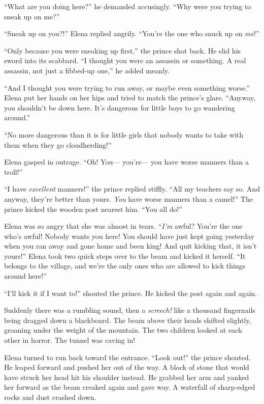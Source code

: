 \documentclass[10pt]{book}
\begin{document}
``What are you doing here?'' he demanded accusingly. ``Why were you trying to sneak up on me?''

``Sneak up on you?!'' Elena replied angrily. ``You're the one who snuck up on \emph{me}!''

``Only because you were sneaking up first,'' the prince shot back. He slid his sword into its scabbard. ``I thought you were an assassin or something. A real assassin, not just a fibbed-up one,'' he added meanly.

``And I thought you were trying to run away, or maybe even something worse.'' Elena put her hands on her hips and tried to match the prince's glare. ``Anyway, you shouldn't be down here. It's dangerous for little boys to go wandering around.''

``No more dangerous than it is for little girls that nobody wants to take with them when they go cloudherding!''

Elena gasped in outrage. ``Oh! You--- you're--- you have worse manners than a troll!''

``I have \emph{excellent} manners!'' the prince replied stiffly. ``All my teachers say so. And anyway, they're better than yours. \emph{You} have worse manners than a camel!'' The prince kicked the wooden post nearest him. ``You all do!''

Elena was so angry that she was almost in tears. ``\emph{I'm} awful? You're the one who's awful! Nobody wants you here! You should have just kept going yesterday when you ran away and gone home and been king! And quit kicking that, it isn't yours!'' Elena took two quick steps over to the beam and kicked it herself. ``It belongs to the village, and we're the only ones who are allowed to kick things around here!''

``I'll kick it if I want to!'' shouted the prince. He kicked the post again and again.

Suddenly there was a rumbling sound, then a \emph{screech!} like a thousand fingernails being dragged down a blackboard. The beam above their heads shifted slightly, groaning under the weight of the mountain. The two children looked at each other in horror. The tunnel was caving in!

Elena turned to run back toward the entrance.  ``Look out!'' the prince shouted.  He leaped forward and pushed her out of the way.  A block of stone that would have struck her head hit his shoulder instead.  He grabbed her arm and yanked her forward as the beam creaked again and gave way. A waterfall of sharp-edged rocks and dust crashed down.
\end{document}
